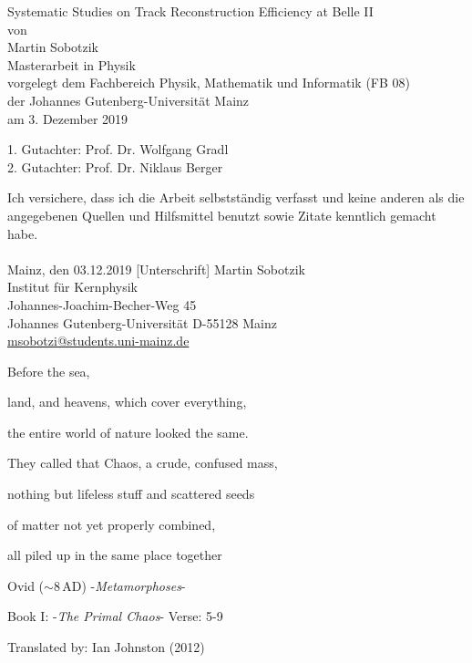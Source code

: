 \documentclass[a4paper,11pt,twosided,final,german,openbib,pdftex,listof=totoc,bibliography=totoc]{scrbook}
\newcommand\blankpage{%
	\null
	\thispagestyle{empty}%
	\addtocounter{page}{-1}%
	\newpage}
\begin{document}

\begin{titlepage}
  \vspace*{6mm}
  \begin{center}
     {\afont Systematic Studies on Track Reconstruction Efficiency at Belle II}
     \\[3.5cm]
     {\large von}
     \\[3.5cm]
     {\dfont Martin Sobotzik}
     \\[2cm]
     {\large Masterarbeit in Physik \/\\
        vorgelegt dem Fachbereich Physik, Mathematik und Informatik (FB 08) \/\\
        der Johannes Gutenberg-Universit\"at Mainz \/\\
        am 3. Dezember 2019}
   \end{center}
   \vfill
   1. Gutachter: Prof. Dr. Wolfgang Gradl\\	
   2. Gutachter: Prof. Dr. Niklaus Berger\\
   \vfill

\afterpage{\blankpage}


\end{titlepage}
\newpage


 

\thispagestyle{empty}
Ich versichere, dass ich die Arbeit selbstst\"andig verfasst und keine 
anderen als die angegebenen Quellen und Hilfsmittel benutzt sowie 
Zitate kenntlich gemacht habe.
\\
\\[3.5cm] 
Mainz, den 03.12.2019 [Unterschrift]
\vfill
\noindent 
Martin Sobotzik\\
Institut f\"ur Kernphysik\\
Johannes-Joachim-Becher-Weg 45\\
Johannes Gutenberg-Universit\"at
D-55128 Mainz\\
{\href{msobotzi@students.uni-mainz.de}{msobotzi@students.uni-mainz.de}}




\afterpage{\blankpage}

\newpage


\epigraph{Before the sea,                     
	              
	land, and heavens, which cover everything,
	
	the entire world of nature looked the same.
	
	They called that Chaos, a crude, confused mass,                              
	
	nothing but lifeless stuff and scattered seeds
	
	of matter not yet properly combined,
	
	all piled up in the same place together}{Ovid ($\sim 8\,\textrm{AD}$) -\textit{Metamorphoses}-
	
Book I: -\textit{The Primal Chaos}- Verse: 5-9

Translated by: Ian Johnston (2012)
}
\end{document}
